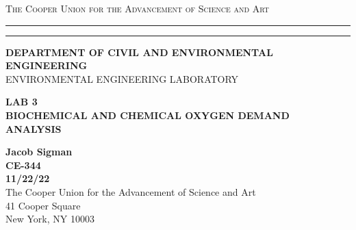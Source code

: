 \begin{titlepage}
    \begin{center}
    {{\Large{\textsc{The Cooper Union for the Advancement of Science and Art}}}} \rule[0.1cm]{15.8cm}{0.1mm}
    \rule[0.5cm]{15.8cm}{0.6mm}
    {\small{\bf DEPARTMENT OF CIVIL AND ENVIRONMENTAL ENGINEERING}}\\
    {\footnotesize{ENVIRONMENTAL ENGINEERING LABORATORY}}
    \end{center}
    \vspace{15mm}
    \begin{center}
    {\large{\bf LAB 3\\}}
    \vspace{5mm}
    {\Large{\bf BIOCHEMICAL AND CHEMICAL OXYGEN DEMAND\\}}
    \vspace{3mm}
    {\Large{\bf ANALYSIS}}
    \end{center}
    \vspace{35mm}
    \par
    \noindent
    \hfill
    \vspace{60mm}
    \begin{center}
    {\large{\bf Jacob Sigman \\ CE-344 \\ 11/22/22 \\}}
    \vspace{20mm}
    {\normalsize{The Cooper Union for the Advancement of Science and Art \\ 41 Cooper Square\\
    New York, NY 10003}}
    \end{center}
\end{titlepage}